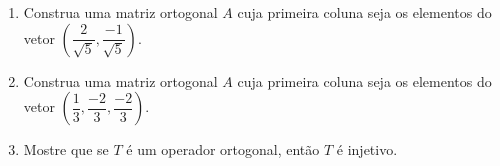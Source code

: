 {\begin{enumerate}
\item Construa uma matriz ortogonal  $A$ cuja primeira coluna seja os elementos do vetor $(\dfrac{2}{\sqrt{5}}, \dfrac{-1}{\sqrt{5}})$.

\item Construa uma matriz ortogonal  $A$ cuja primeira coluna seja os elementos do vetor $(\dfrac{1}{3}, \dfrac{-2}{3}, \dfrac{-2}{3})$.

\item Mostre que se $T$  é um operador ortogonal, então $T$ é injetivo.



%
%
%
%
%
%
%

\end{enumerate}}
